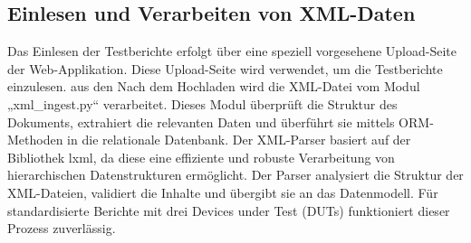 \subsection{Einlesen und Verarbeiten von XML-Daten}
\label{subsec:einlesen-und-verarbeiten-von-xml-daten}


Das Einlesen der Testberichte erfolgt über eine speziell vorgesehene Upload-Seite der Web-Applikation.
Diese Upload-Seite wird verwendet, um die Testberichte einzulesen.
aus den  Nach dem Hochladen wird die XML-Datei vom Modul „xml\_ingest.py“ verarbeitet.
Dieses Modul überprüft die Struktur des Dokuments, extrahiert die relevanten Daten und überführt sie mittels ORM-Methoden in die relationale Datenbank.
Der XML-Parser basiert auf der Bibliothek lxml, da diese eine effiziente und robuste Verarbeitung von hierarchischen Datenstrukturen ermöglicht.
Der Parser analysiert die Struktur der XML-Dateien, validiert die Inhalte und übergibt sie an das Datenmodell.
Für standardisierte Berichte mit drei Devices under Test (DUTs) funktioniert dieser Prozess zuverlässig.



